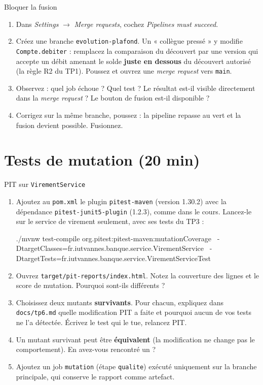 \documentclass[11pt]{article}
\begin{document}
\begin{exobox}{Bloquer la fusion}
\begin{enumerate}[leftmargin=1.4em]
  \item Dans \textit{Settings} $\rightarrow$ \textit{Merge requests}, cochez \textit{Pipelines must succeed}.
  \item Créez une branche \texttt{evolution-plafond}. Un « collègue pressé » y modifie \texttt{Compte.debiter} : remplacez la comparaison du découvert par une version qui accepte un débit amenant le solde \textbf{juste en dessous} du découvert autorisé (la règle R2 du TP1). Poussez et ouvrez une \textit{merge request} vers \texttt{main}.
  \item Observez : quel job échoue ? Quel test ? Le résultat est-il visible directement dans la \textit{merge request} ? Le bouton de fusion est-il disponible ?
  \item Corrigez sur la même branche, poussez : la pipeline repasse au vert et la fusion devient possible. Fusionnez.
\end{enumerate}
\end{exobox}

\section{Tests de mutation (20 min)}

\begin{exobox}{PIT sur \texttt{VirementService}}
\begin{enumerate}[leftmargin=1.4em]
  \item Ajoutez au \texttt{pom.xml} le plugin \texttt{pitest-maven} (version 1.30.2) avec la dépendance \texttt{pitest-junit5-plugin} (1.2.3), comme dans le cours. Lancez-le sur le service de virement seulement, avec ses tests du TP3 :
\begin{codebox}
./mvnw test-compile org.pitest:pitest-maven:mutationCoverage \
  -DtargetClasses=fr.iutvannes.banque.service.VirementService \
  -DtargetTests=fr.iutvannes.banque.service.VirementServiceTest
\end{codebox}
  \item Ouvrez \texttt{target/pit-reports/index.html}. Notez la couverture des lignes et le score de mutation. Pourquoi sont-ils différents ?
  \item Choisissez deux mutants \textbf{survivants}. Pour chacun, expliquez dans \texttt{docs/tp6.md} quelle modification PIT a faite et pourquoi aucun de vos tests ne l'a détectée. Écrivez le test qui le tue, relancez PIT.
  \item Un mutant survivant peut être \textbf{équivalent} (la modification ne change pas le comportement). En avez-vous rencontré un ?
  \item Ajoutez un job \texttt{mutation} (étape \texttt{qualite}) exécuté uniquement sur la branche principale, qui conserve le rapport comme artefact.
\end{enumerate}
\end{exobox}
\end{document}
